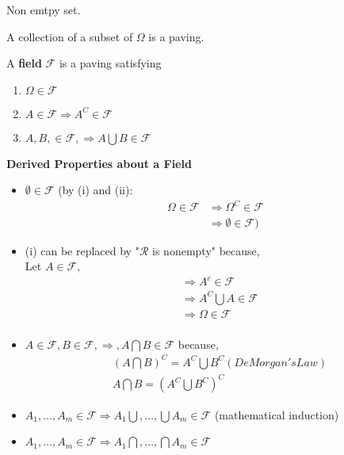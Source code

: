 \documentclass[11pt,fleqn]{book} %
\begin{document}
\begin{definition}[$\Omega$] Non emtpy set. 
	
\end{definition}

\begin{definition}[Paving] A collection of a subset of $\Omega$ is a paving. 
	
\end{definition}

\begin{definition}[Field] \label{def:1.1}

 A \textbf{field} $\mathcal{F}$ is a paving satisfying
	\begin{enumerate}[label = (\roman*)]
		\item $\Omega \in \mathcal{F}$
		\item $A \in \mathcal{F} \Rightarrow A^C \in \mathcal{F}$
		\item $A, B, \in \mathcal{F}, \Rightarrow A \bigcup B \in \mathcal{F}$
	\end{enumerate}
	
\end{definition}

\textbf{Derived Properties about a Field }

\begin{itemize}
	\item $\emptyset \in \mathcal{F}$ 
		(by (i) and (ii): 
		\begin{align*}
			\Omega \in \mathcal{F} &\Rightarrow \Omega^C \in \mathcal{F}\\
			&\Rightarrow \emptyset \in \mathcal{F})
		\end{align*}
			
	\item (i) can be replaced by "$\mathcal{R}$ is nonempty" because,\\ 
		Let $A \in \mathcal{F}, $
			\begin{align*}
				&\Rightarrow A^c \in \mathcal{F}\\
			&\Rightarrow A^C \bigcup A \in \mathcal{F}\\
			&\Rightarrow \Omega \in \mathcal{F}\\
			\end{align*}
			
	\item $A \in \mathcal{F}, B \in \mathcal{F}, \Rightarrow, A\bigcap  B \in \mathcal{F}$ 
	because, \\
		\begin{align*}
		&(A\bigcap  B)^C = A^C \bigcup B^C (DeMorgan's Law)\\
		&A \bigcap  B = (A^C \bigcup B^C)^C	
		\end{align*}
		

	\item $A_1, \dots, A_m \in \mathcal{F} \Rightarrow A_1 \bigcup, \dots, \bigcup A_m \in \mathcal{F} $ (mathematical induction)
	\item$A_1, \dots, A_m \in \mathcal{F} \Rightarrow A_1 \bigcap, \dots, \bigcap  A_m \in \mathcal{F} $ 
\end{itemize}
\end{document}
